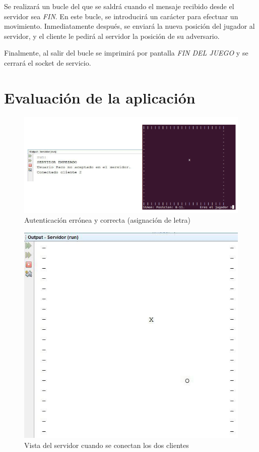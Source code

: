 Se realizará un bucle del que se saldrá cuando el mensaje recibido desde el servidor sea \textit{FIN}. En este bucle, se introducirá un carácter para efectuar un movimiento. Inmediatamente después, se enviará la nueva posición del jugador al servidor, y el cliente le pedirá al servidor la posición de su adversario. 

Finalmente, al salir del bucle se imprimirá por pantalla \textit{FIN DEL JUEGO} y se cerrará el socket de servicio.

\newpage

\section{Evaluación de la aplicación}


\begin{figure}[h]
	\centering
	\includegraphics[width=1.1\textwidth]{img/erroneo}
	\caption{Autenticación errónea y correcta (asignación de letra)}
\end{figure}

	
\begin{figure}[h]
	\centering
	\includegraphics[width=.5\textwidth]{img/8}
	\caption{Vista del servidor cuando se conectan los dos clientes}
\end{figure}

